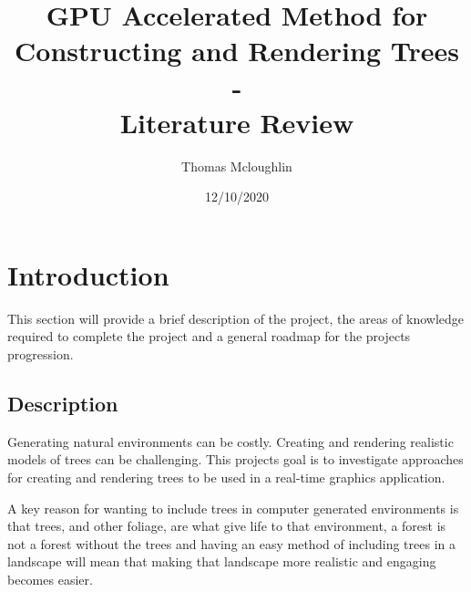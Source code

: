 \documentclass[review]{cmpreport}
\title{GPU Accelerated Method for Constructing and Rendering Trees 
        \\ - \\ 
        Literature Review}
\author{Thomas Mcloughlin}
\date{12/10/2020}
\begin{document}
\maketitle

\section{Introduction}
This section will provide a brief description of the project, the areas of 
knowledge required to complete the project and a general roadmap for the projects 
progression.

\subsection{Description}
Generating natural environments can be costly. Creating and rendering realistic 
models of trees can be challenging. This projects goal is to investigate 
approaches for creating and rendering trees to be used in a real-time graphics 
application. \par
A key reason for wanting to include trees in computer generated environments is 
that trees, and other foliage, are what give life to that environment, a forest 
is not a forest without the trees and having an easy method of including trees 
in a landscape will mean that making that landscape more realistic and engaging 
becomes easier.
\end{document}
